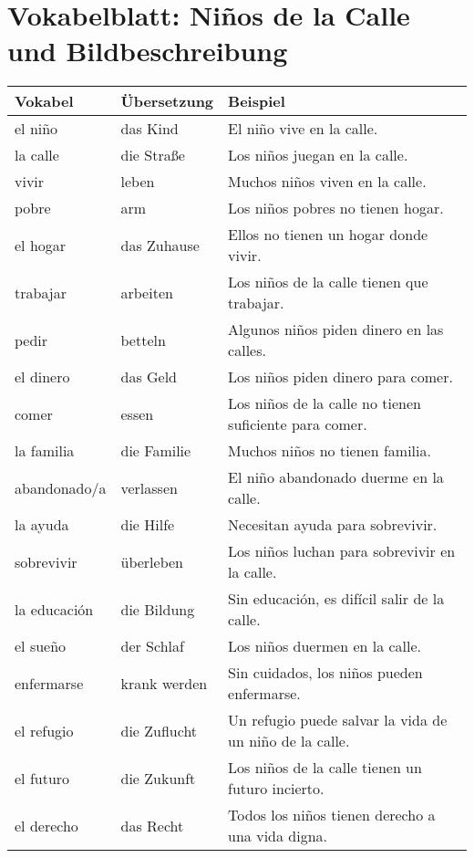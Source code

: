 \documentclass{article}
\begin{document}
\begin{table}
\centering
\section*{Vokabelblatt: Niños de la Calle und Bildbeschreibung}
\begin{tabular}{| m{4cm} | m{4cm} | m{6cm} |}
\hline
\textbf{Vokabel} & \textbf{Übersetzung} & \textbf{Beispiel} \\
\hline
el niño & das Kind & El niño vive en la calle. \\
\hline
la calle & die Straße & Los niños juegan en la calle. \\
\hline
vivir & leben & Muchos niños viven en la calle. \\
\hline
pobre & arm & Los niños pobres no tienen hogar. \\
\hline
el hogar & das Zuhause & Ellos no tienen un hogar donde vivir. \\
\hline
trabajar & arbeiten & Los niños de la calle tienen que trabajar. \\
\hline
pedir & betteln & Algunos niños piden dinero en las calles. \\
\hline
el dinero & das Geld & Los niños piden dinero para comer. \\
\hline
comer & essen & Los niños de la calle no tienen suficiente para comer. \\
\hline
la familia & die Familie & Muchos niños no tienen familia. \\
\hline
abandonado/a & verlassen & El niño abandonado duerme en la calle. \\
\hline
la ayuda & die Hilfe & Necesitan ayuda para sobrevivir. \\
\hline
sobrevivir & überleben & Los niños luchan para sobrevivir en la calle. \\
\hline
la educación & die Bildung & Sin educación, es difícil salir de la calle. \\
\hline
el sueño & der Schlaf & Los niños duermen en la calle. \\
\hline
enfermarse & krank werden & Sin cuidados, los niños pueden enfermarse. \\
\hline
el refugio & die Zuflucht & Un refugio puede salvar la vida de un niño de la calle. \\
\hline
el futuro & die Zukunft & Los niños de la calle tienen un futuro incierto. \\
\hline
el derecho & das Recht & Todos los niños tienen derecho a una vida digna. \\

\end{tabular}
\end{table}
\end{document}
